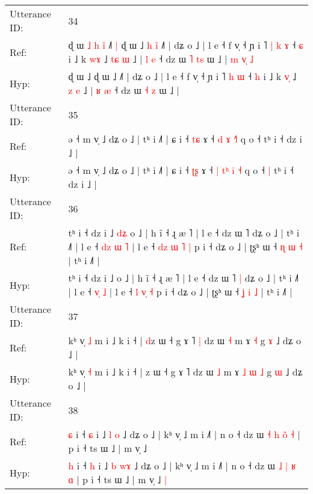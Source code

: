 \documentclass[10pt]{article}
\DeclareRobustCommand{\hl}[1]{{\textcolor{red}{#1}}}
\begin{document}
\begin{longtable}{ll}
 \\
\midrule
Utterance ID: & 34 \\
Ref: & ɖ ɯ\hl{ }\hl{˩}\hl{ }\hl{h}\hl{ }\hl{i}\hl{̃} ˩\hl{˥}\hl{ }\hl{|} ɖ ɯ ˩\hl{ }\hl{h}\hl{ }\hl{i}\hl{̃} ˩˥ | dʑ o ˩ | l e ˧ f v̩ ˧ ɲ i ˥\hl{ }\hl{|} \hl{k} \hl{ɤ} ˧ \hl{ɕ} i ˩ k \hl{w}\hl{ɤ} ˩ \hl{t}\hl{ɕ} \hl{ɯ} ˩ | \hl{l} \hl{e} ˧ dz ɯ \hl{˥} \hl{t}\hl{s} ɯ ˩ |\hl{ }\hl{m}\hl{ }\hl{v}\hl{̩}\hl{ }\hl{˩}
 \\
Hyp: & ɖ ɯ\hl{}\hl{}\hl{}\hl{}\hl{}\hl{}\hl{} ˩\hl{}\hl{}\hl{} ɖ ɯ ˩\hl{}\hl{}\hl{}\hl{}\hl{} ˩˥ | dʑ o ˩ | l e ˧ f v̩ ˧ ɲ i ˥\hl{}\hl{} \hl{h} \hl{ɯ} ˧ \hl{h} i ˩ k \hl{v}\hl{̩} ˩ \hl{}\hl{z} \hl{e} ˩ | \hl{ʁ} \hl{æ} ˧ dz ɯ \hl{˧} \hl{}\hl{z} ɯ ˩ |\hl{}\hl{}\hl{}\hl{}\hl{}\hl{}\hl{}
 \\
\midrule
Utterance ID: & 35 \\
Ref: & ə ˧ m v̩ ˩ dʑ o ˩ | tʰ i ˩˥ | ɕ i ˧ \hl{t}\hl{ɕ} ɤ ˧ \hl{d} \hl{}\hl{ɤ} \hl{}\hl{˧}\hl{˥} q o ˧\hl{}\hl{} tʰ i ˧ dz i ˩ |
 \\
Hyp: & ə ˧ m v̩ ˩ dʑ o ˩ | tʰ i ˩˥ | ɕ i ˧ \hl{ʈ}\hl{ʂ} ɤ ˧ \hl{|} \hl{t}\hl{ʰ} \hl{i}\hl{ }\hl{˧} q o ˧\hl{ }\hl{|} tʰ i ˧ dz i ˩ |
 \\
\midrule
Utterance ID: & 36 \\
Ref: & tʰ i ˧ dz i ˩\hl{ }\hl{d}\hl{ʑ} o ˩ | h ĩ ˧ ɻ æ ˥ | l e ˧ dz ɯ ˥\hl{}\hl{} dʑ o ˩ | tʰ i ˩˥ | l e ˧ \hl{d}\hl{z}\hl{ }\hl{ɯ} \hl{˥} | l e ˧ \hl{d}\hl{z} \hl{ɯ}\hl{ }\hl{˥} \hl{|} p i ˧ dʑ o ˩ | ʈʂʰ ɯ ˧ \hl{ɳ} \hl{ɯ} \hl{˧} | tʰ i ˩˥ |
 \\
Hyp: & tʰ i ˧ dz i ˩\hl{}\hl{}\hl{} o ˩ | h ĩ ˧ ɻ æ ˥ | l e ˧ dz ɯ ˥\hl{ }\hl{|} dʑ o ˩ | tʰ i ˩˥ | l e ˧ \hl{}\hl{}\hl{v}\hl{̩} \hl{˩} | l e ˧ \hl{}\hl{l} \hl{}\hl{v}\hl{̩} \hl{˧} p i ˧ dʑ o ˩ | ʈʂʰ ɯ ˧ \hl{ʝ} \hl{i} \hl{˩} | tʰ i ˩˥ |
 \\
\midrule
Utterance ID: & 37 \\
Ref: & kʰ v̩ \hl{˩} m i ˩ k i ˧ | \hl{d}z ɯ ˧ g ɤ ˥\hl{ }\hl{|} dz ɯ \hl{˧} m ɤ\hl{}\hl{}\hl{}\hl{} \hl{˧} g \hl{ɤ} ˩ dʑ o ˩ |
 \\
Hyp: & kʰ v̩ \hl{˧} m i ˩ k i ˧ | \hl{}z ɯ ˧ g ɤ ˥\hl{}\hl{} dz ɯ \hl{˩} m ɤ\hl{ }\hl{˩}\hl{ }\hl{ɯ} \hl{˩} g \hl{ɯ} ˩ dʑ o ˩ |
 \\
\midrule
Utterance ID: & 38 \\
Ref: & \hl{ɕ} i ˧ \hl{ɕ} i ˩ \hl{l} \hl{}\hl{o} ˩ dʑ o ˩ | kʰ v̩ ˩ m i ˩˥ | n o ˧ dz ɯ \hl{˧} \hl{h} \hl{o}\hl{̃} \hl{˧} | p i ˧ ts ɯ ˩ | m v̩ ˩\hl{}\hl{}
 \\
Hyp: & \hl{h} i ˧ \hl{h} i ˩ \hl{b} \hl{w}\hl{ɤ} ˩ dʑ o ˩ | kʰ v̩ ˩ m i ˩˥ | n o ˧ dz ɯ \hl{˩} \hl{|} \hl{}\hl{ʁ} \hl{ɑ} | p i ˧ ts ɯ ˩ | m v̩ ˩\hl{ }\hl{|}

\end{longtable}
\end{document}
